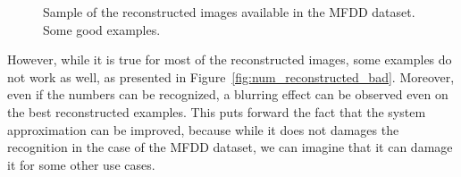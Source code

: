 \begin{figure}[H]
    \caption{Sample of the reconstructed images available in the MFDD dataset. Some good examples.}
\label{fig:num_reconstructed}
\end{figure}

However, while it is true for most of the reconstructed images, some examples do not work as well, as presented in Figure~\ref{fig:num_reconstructed_bad}. Moreover, even if the numbers can be recognized, a blurring effect can be observed even on the best reconstructed examples. This puts forward the fact that the system approximation can be improved, because while it does not damages the recognition in the case of the MFDD dataset, we can imagine that it can damage it for some other use cases.

